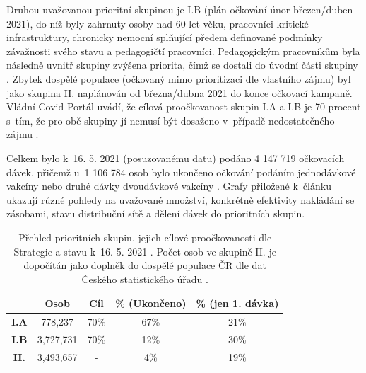 %
Druhou uvažovanou prioritní skupinou je I.B (plán očkování únor-březen/duben 2021), do níž byly zahrnuty osoby nad 60 let věku, pracovníci kritické infrastruktury, chronicky nemocní splňující předem definované podmínky závažnosti svého stavu a pedagogičtí pracovníci. %
Pedagogickým pracovníkům byla následně uvnitř skupiny zvýšena priorita, čímž se dostali do úvodní části skupiny \cite{prioritizace_ockovani}. Zbytek dospělé populace (očkovaný mimo prioritizaci dle vlastního zájmu) byl jako skupina II. naplánován od března/dubna 2021 do konce očkovací kampaně. Vládní Covid Portál uvádí, že cílová proočkovanost skupin I.A a I.B je 70 procent s~tím, že pro obě skupiny jí nemusí být dosaženo v~případě nedostatečného zájmu \cite{kdoprvni}.

Celkem bylo k~16. 5. 2021 (posuzovanému datu) podáno 4 147 719 očkovacích dávek, přičemž u~1 106 784 osob bylo ukončeno očkování podáním jednodávkové vakcíny nebo druhé dávky dvoudávkové vakcíny \cite{mzcr_data}. Grafy přiložené k~článku ukazují různé pohledy na uvažované množství, konkrétně efektivity na\-klá\-dá\-ní se zásobami, stavu distribuční sítě a dělení dávek do prioritních skupin.



\begin{table}
\begin{minipage}{\textwidth} 
\begin{centering}
\begin{tabular}{|c|c|c|c|c|}
\hline
& \textbf{Osob} & \textbf{Cíl} & \textbf{\% (Ukončeno)} & \textbf{\% (jen 1. dávka)}  \\
\hline
\textbf{I.A} & 778,237 & 70\% & 67\% & 21\% \\
\hline
\textbf{I.B} & 3,727,731 & 70\% & 12\% & 30\%\\
\hline
\textbf{II.} & 3,493,657 & - & 4\% & 19\% \\
\hline
\end{tabular}
	\caption{Přehled prioritních skupin, jejich cílové proočkovanosti dle Strategie a stavu k~16. 5. 2021 \cite{strategie_covid}. Počet osob ve skupině II. je dopočítán jako doplněk do dospělé populace ČR dle dat Českého statistického úřadu \cite{obyvatele_pocet}.}
    \label{tab_skupiny}
    
    \end{centering}
\end{minipage}
\end{table}


